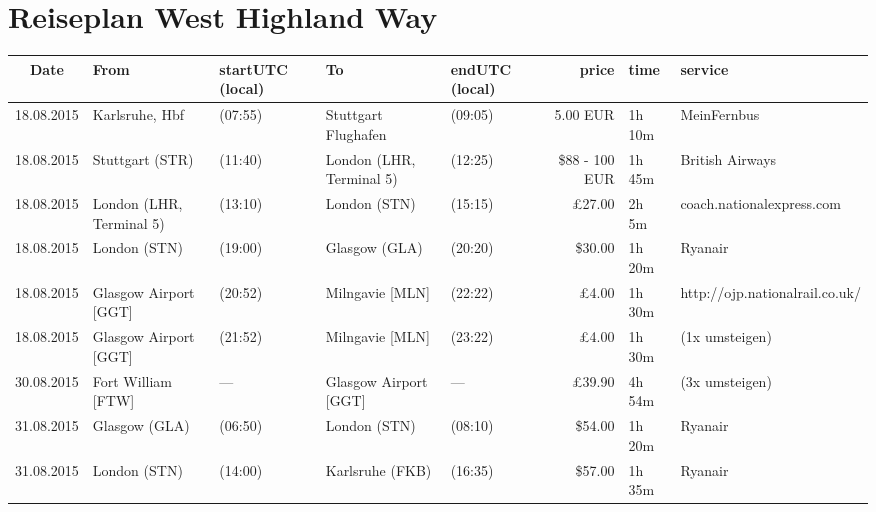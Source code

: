 \documentclass[a4paper, landscape]{scrartcl}
\begin{document}
\clearpage
\section*{Reiseplan West Highland Way}
\vspace*{\fill}
    \begin{table}[ht]
        \centering
        \begin{tabular}{cl p{2cm} l p{2cm} rl p{5cm}}
        \toprule
    \textbf{Date}  & \textbf{From}              & \textbf{start\newline UTC (local)} & \textbf{To} & \textbf{end\newline UTC (local)} & \textbf{price} & \textbf{time} & \textbf{service} \\ \midrule
    18.08.2015 & Karlsruhe, Hbf           & (07:55)          & Stuttgart Flughafen      & (09:05)        &     5.00 EUR   & 1h 10m & MeinFernbus      \\
    18.08.2015 & Stuttgart (STR)          & (11:40)          & London (LHR, Terminal 5) & (12:25)        & \$88 - 100 EUR & 1h 45m & British Airways \\
    18.08.2015 & London (LHR, Terminal 5) & (13:10)          & London (STN)             & (15:15)        &   £27.00       & 2h 5m  & coach.nationalexpress.com           \\
    18.08.2015 & London (STN)             & (19:00)          & Glasgow (GLA)            & (20:20)        &  \$30.00       & 1h 20m & Ryanair                             \\
    18.08.2015 & Glasgow Airport [GGT]    & (20:52)          & Milngavie [MLN]          & (22:22)        &    £4.00       & 1h 30m & http://ojp.nationalrail.co.uk/      \\
    18.08.2015 & Glasgow Airport [GGT]    & (21:52)          & Milngavie [MLN]          & (23:22)        &    £4.00       & 1h 30m & (1x umsteigen)                      \\ \hline
    30.08.2015 & Fort William [FTW]       & ---              & Glasgow Airport [GGT]    & ---            &   £39.90       & 4h 54m & (3x umsteigen)                      \\
    31.08.2015 & Glasgow (GLA)            & (06:50)          & London (STN)             & (08:10)        &  \$54.00       & 1h 20m & Ryanair                             \\
    31.08.2015 & London (STN)             & (14:00)          & Karlsruhe (FKB)          & (16:35)        &  \$57.00       & 1h 35m & Ryanair                             \\\midrule

\end{tabular}
\end{table}
\end{document}
